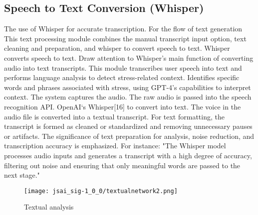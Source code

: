 \documentclass[a4j, twocolumn]{article}
\begin{document}
\subsection{Speech to Text Conversion (Whisper)}
\vspace{5mm} %
The use of Whisper for accurate transcription. For the flow of text generation This text processing module combines the manual transcript input option, text cleaning and preparation, and whisper to convert speech to text. Whisper converts speech to text. Draw attention to Whisper's main function of converting audio into text transcripts.  This module transcribes user speech into text and performs language analysis to detect stress-related context. Identifies specific words and phrases associated with stress, using GPT-4's capabilities to interpret context. The system captures the audio. The raw audio is passed into the speech recognition API. OpenAI‘s Whisper[16] to convert into text. The voice in the audio file is converted into a textual transcript. For text formatting, the transcript is formed as cleaned or standardized and removing unnecessary pauses or artifacts. 
 The significance of text preparation for analysis, noise reduction, and transcription accuracy is emphasized. For instance: "The Whisper model processes audio inputs and generates a transcript with a high degree of accuracy, filtering out noise and ensuring that only meaningful words are passed to the next stage." 
\vspace{-5mm} %
\vspace{10pt} %
\begin{figure}[H]
\centering
\texttt{[image: jsai\_sig-1\_0\_0/textualnetwork2.png]}
\caption{Textual analysis}
\label{fig:system_architecture}
\end{figure}
\vspace{10pt} %
\end{document}

